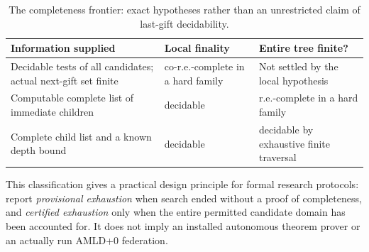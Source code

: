 \documentclass[11pt,letterpaper]{article}
\theoremstyle{definition}\newtheorem{definition}[theorem]{Definition}\newtheorem{example}[theorem]{Example}
\theoremstyle{remark}\newtheorem{remark}[theorem]{Remark}
\begin{document}
\begin{table}[htbp]\centering\small
\begin{tabularx}{\textwidth}{@{}p{}X X@{}}\toprule
Information supplied & Local finality & Entire tree finite? \\ \midrule
Decidable tests of all candidates; actual next-gift set finite & co-r.e.-complete in a hard family & Not settled by the local hypothesis \\
Computable complete list of immediate children & decidable & r.e.-complete in a hard family \\
Complete child list and a known depth bound & decidable & decidable by exhaustive finite traversal \\
\bottomrule\end{tabularx}
\caption{The completeness frontier: exact hypotheses rather than an unrestricted claim of last-gift decidability.}
\end{table}

This classification gives a practical design principle for formal research protocols: report \emph{provisional exhaustion} when search ended without a proof of completeness, and \emph{certified exhaustion} only when the entire permitted candidate domain has been accounted for. It does not imply an installed autonomous theorem prover or an actually run AMLD+0 federation.
\end{document}

